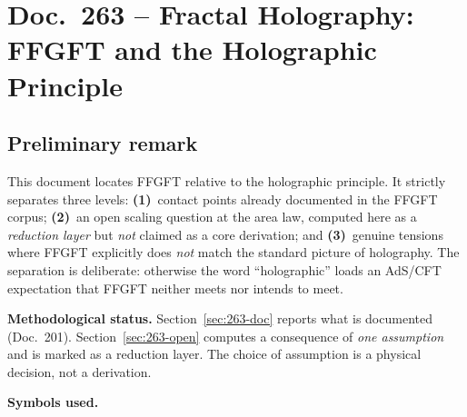 
\chapter*{Doc.~263 -- Fractal Holography: FFGFT and the Holographic Principle}

\section*{Preliminary remark}

This document locates FFGFT relative to the holographic principle. It
strictly separates three levels: \textbf{(1)}~contact points already
documented in the FFGFT corpus; \textbf{(2)}~an open scaling question at the
area law, computed here as a \emph{reduction layer} but \emph{not} claimed as
a core derivation; and \textbf{(3)}~genuine tensions where FFGFT explicitly
does \emph{not} match the standard picture of holography. The separation is
deliberate: otherwise the word \enquote{holographic} loads an AdS/CFT
expectation that FFGFT neither meets nor intends to meet.

\medskip

\textbf{Methodological status.} Section~\ref{sec:263-doc} reports what is
documented (Doc.~201). Section~\ref{sec:263-open} computes a consequence of
\emph{one assumption} and is marked as a reduction layer. The choice of
assumption is a physical decision, not a derivation.

\medskip

\textbf{Symbols used.}

